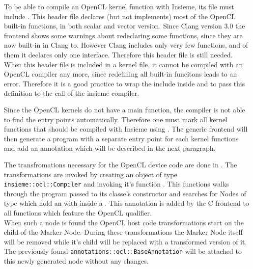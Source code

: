 To be able to compile an OpenCL kernel function with Insieme, its file must include . This header file declares (but not implements) most of the OpenCL built-in functions, in both scalar and vector version. Since Clang version 3.0 the frontend shows some warnings about redeclaring some functions, since they are now built-in in Clang to. However Clang includes only very few functions, and of them it declares only one interface. Therefore this header file is still needed. When this header file is included in a kernel file, it cannot be compiled with an OpenCL compiler any more, since redefining all built-in funcitons leads to an error. Therefore it is a good practice to wrap the include inside  and to pass this definition to the call of the insieme compiler. 

Since the OpenCL kernels do not have a main function, the compiler is not able to find the entry points automatically. Therefore one must mark all kernel functions that should be compiled with Insieme using . The generic frontend will then generate a program with a separate entry point for each kernel functions and add an annotation which will be described in the next paragraph.

The transfromations necessary for the OpenCL device code are done in . The transformations are invoked by creating an object of type \texttt{insieme::ocl::Compiler} and invoking it's function . This functions walks through the program passed to its classe's constructor and searches for Nodes of type  which hold an  with inside a . This annotation is added by the C frontend to all functions which feature the OpenCL  qualifier. \\

When such a node is found the OpenCL host code transformations start on the child of the Marker Node. During these transformations the Marker Node itself will be removed while it's child will be replaced with a transformed version of it. The previously found \texttt{annotations::ocl::BaseAnnotation} will be attached to this newly generated node without any changes. \\

